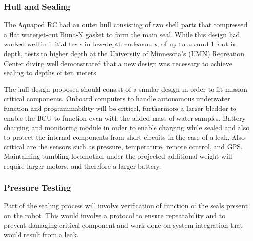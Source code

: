 


\subsubsection{Hull and Sealing}

The Aquapod RC had an outer hull consisting of two shell parts that compressed a flat waterjet-cut Buna-N gasket to form the main seal. While this design had worked well in initial tests in low-depth endeavours, of up to around 1 foot in depth, tests to higher depth at the University of Minnesota's (UMN) Recreation Center diving well demonstrated that a new design was necessary to achieve sealing to depths of ten meters. 

The hull design proposed should consist of a similar design in order to fit mission critical components. Onboard computers to handle autonomous underwater function and programmability will be critical, furthermore a larger bladder to enable the BCU to function even with the added mass of water samples. Battery charging and monitoring module in order to enable charging while sealed and also to protect the internal components from short circuits in the case of a leak. Also critical are the sensors such as pressure, temperature, remote control, and GPS. Maintaining tumbling locomotion under the projected additional weight will require larger motors, and therefore a larger battery. 

\subsubsection{Pressure Testing}
Part of the sealing process will involve verification of function of the seals present on the robot. This would involve a protocol to ensure repeatability and to prevent damaging critical component and work done on system integration that would result from a leak. 

